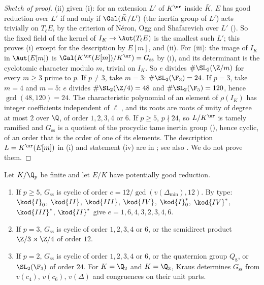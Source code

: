 \begin{proof}[Sketch of proof]
(ii) given (i): for an extension $L'$ of $K^{\ur}$ inside $\bar K$, $E$ has good reduction over $L'$ if and only if
$\Gal(\bar K/L')$ (the inertia group of $L'$) acts trivially on $T_\ell E$, by the criterion of N\'eron, Ogg and
Shafarevich over $L'$ (). So the fixed field of the kernel of $I_K\to\Aut(T_\ell E)$ is the smallest such
$L'$; this proves (i) except for the description by $E[m]$, and (ii). For (iii): the image of $I_K$ in $\Aut(E[m])$ is
$\Gal(K^{\ur}(E[m])/K^{\ur})=G_{\mathrm{ss}}$ by (i), and its determinant is the cyclotomic character modulo $m$, trivial on
$I_K$. So $e$ divides $\#\SL_2(\Z/m)$ for every $m\ge3$ prime to $p$. If $p\ne3$, take $m=3$: $\#\SL_2(\F_3)=24$. If $p=3$, take
$m=4$ and $m=5$: $e$ divides $\#\SL_2(\Z/4)=48$ and $\#\SL_2(\F_5)=120$, hence $\gcd(48,120)=24$. The characteristic polynomial of an element of $\rho(I_K)$ has integer coefficients
independent of $\ell$ \cite[Section 2]{SerreTate68}, and its roots are roots of unity of degree at most $2$
over $\Q$, of order $1,2,3,4$ or $6$. If $p\ge5$, $p\nmid24$, so $L/K^{\ur}$ is tamely ramified and $G_{\mathrm{ss}}$ is a
quotient of the procyclic tame inertia group (), hence cyclic, of an order that is the order of one of its
elements. The description $L=K^{\ur}(E[m])$ in (i) and statement (iv) are in \cite[Section 2]{SerreTate68};
see also \cite[Section 5.6]{Serre72}. We do not prove them.
\end{proof}

\begin{theorem}[Kraus]\label{thm:reduction:kraus}
Let $K/\Q_p$ be finite and let $E/K$ have potentially good reduction.
\begin{enumerate}[label=(\roman*)]
\item If $p\ge5$, $G_{\mathrm{ss}}$ is cyclic of order $e=12/\gcd(v(\Delta_{\min}),12)$. By type: $\kod{I}_0$, $\kod{II}$, $\kod{III}$,
$\kod{IV}$, $\kod{I}_0^*$, $\kod{IV}^*$, $\kod{III}^*$, $\kod{II}^*$ give $e=1,6,4,3,2,3,4,6$.
\item If $p=3$, $G_{\mathrm{ss}}$ is cyclic of order $1,2,3,4$ or $6$, or the semidirect product $\Z/3\rtimes\Z/4$ of order $12$.
\item If $p=2$, $G_{\mathrm{ss}}$ is cyclic of order $1,2,3,4$ or $6$, or the quaternion group $Q_8$, or $\SL_2(\F_3)$ of order
$24$. For $K=\Q_2$ and $K=\Q_3$, Kraus determines $G_{\mathrm{ss}}$ from $v(c_4)$, $v(c_6)$, $v(\Delta)$ and congruences on
their unit parts.
\end{enumerate}
\end{theorem}

